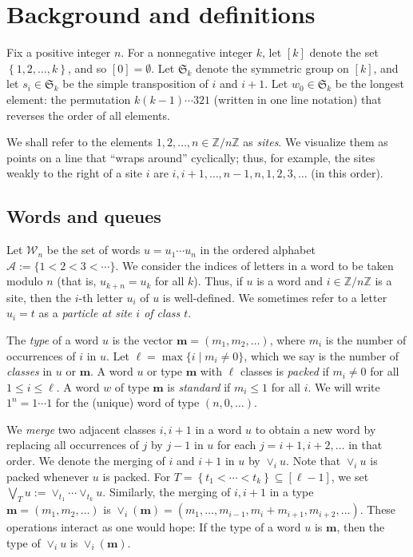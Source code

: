 \documentclass[reqno]{amsart}
\newcommand{\0}{\phantom{c}}
\newcommand{\merge}[1]{\vee_{#1}} %
\newcommand{\SymGp}[1]{\mathfrak{S}_{#1}} %
\newcommand{\mm}{\mathbf{m}}
\newcommand{\mcA}{\mathcal{A}}
\newcommand{\mcW}{\mathcal{W}}
\newcommand{\ZZ}{\mathbb{Z}}
\newcommand{\set}[1]{\left\{ #1 \right\}}
\newcommand{\ive}[1]{\left[ #1 \right]}
\newcommand{\defn}[1]{{\color{darkred}\emph{#1}}} %
\theoremstyle{plain}
\theoremstyle{definition}
\numberwithin{equation}{section}
\begin{document}
\section{Background and definitions}
\label{sec:background}

Fix a positive integer $n$.
For a nonnegative integer $k$, let $\ive{k}$ denote the set $\set{1, 2, \ldots, k}$, and so $[0] = \emptyset$.
Let $\SymGp{k}$ denote the symmetric group on $\ive{k}$, and let $s_i \in \SymGp{k}$ be the simple transposition of $i$ and $i+1$.
Let $w_0 \in \SymGp{k}$ be the longest element: the permutation $k (k-1) \dotsm 321$ (written in one line notation) that reverses the order of all elements.

We shall refer to the elements $1, 2, \ldots, n \in \ZZ / n \ZZ$ as \defn{sites}.
We visualize them as points on a line that ``wraps around'' cyclically; thus, for example, the sites weakly to the right of a site $i$ are $i, i+1, \ldots, n-1, n, 1, 2, 3, \ldots$ (in this order).

\subsection{Words and queues}

Let $\mcW_n$ be the set of words $u = u_1 \dotsm u_n$ in the ordered alphabet $\mcA := \{1 < 2 < 3 < \cdots \}$.
We consider the indices of letters in a word to be taken modulo $n$ (that is, $u_{k+n} = u_k$ for all $k$).
Thus, if $u$ is a word and $i \in \ZZ / n \ZZ$ is a site, then the $i$-th letter $u_i$ of $u$ is well-defined.
We sometimes refer to a letter $u_i = t$ as a \defn{particle at site $i$ of class $t$}.

The \defn{type} of a word $u$ is the vector $\mm = (m_1, m_2, \ldots)$, where $m_i$ is the number of occurrences of $i$ in $u$.
Let $\ell = \max\{i \mid m_i \neq 0 \}$, which we say is the number of \defn{classes} in $u$ or $\mm$.
A word $u$ or type $\mm$ with $\ell$ classes is \defn{packed} if $m_i \neq 0$ for all $1 \leq i \leq \ell$.
A word $w$ of type $\mm$ is \defn{standard} if $m_i \leq 1$ for all $i$.
We will write $1^n = 1 \dotsm 1$ for the (unique) word of type $(n, 0, \dotsc)$.

We \defn{merge} two adjacent classes $i,i+1$ in a word $u$ to obtain a new word by replacing all occurrences of $j$ by $j-1$ in $u$ for each $j = i+1, i+2, \ldots$ in that order.
We denote the merging of $i$ and $i+1$ in $u$ by $\merge{i} u$.
Note that $\merge{i} u$ is packed whenever $u$ is packed.
For $T = \set{t_1 < \cdots < t_k} \subseteq \ive{\ell-1}$, we set $\bigvee_T u := \merge{t_1} \cdots \merge{t_k} u$.
Similarly, the merging of $i,i+1$ in a type $\mm = (m_1, m_2, \ldots)$ is $\merge{i}(\mm) = (m_1, \dotsc, m_{i-1}, m_i + m_{i+1}, m_{i+2}, \ldots)$.
These operations interact as one would hope:
If the type of a word $u$ is $\mm$, then the type of $\merge{i} u$ is $\merge{i}(\mm)$.
\end{document}
